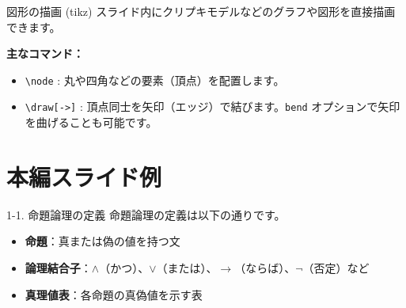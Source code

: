 \documentclass[unicode,10pt]{beamer}
\begin{document}
\begin{frame}[fragile]{図形の描画 (tikz)}
    スライド内にクリプキモデルなどのグラフや図形を直接描画できます。

    \begin{center}
    \end{center}

    \textbf{主なコマンド：}
    \begin{itemize}
        \item \verb|\node| : 丸や四角などの要素（頂点）を配置します。
        \item \verb|\draw[->]| : 頂点同士を矢印（エッジ）で結びます。\verb|bend| オプションで矢印を曲げることも可能です。
    \end{itemize}
\end{frame}

\section{本編スライド例}

\begin{frame}{1-1. 命題論理の定義}
    命題論理の定義は以下の通りです。
    \begin{itemize}
        \item \textbf{命題}：真または偽の値を持つ文
        \item \textbf{論理結合子}：$\land$（かつ）、$\lor$（または）、$\rightarrow$（ならば）、$\neg$（否定）など
        \item \textbf{真理値表}：各命題の真偽値を示す表
    \end{itemize}
\end{frame}
\end{document}
